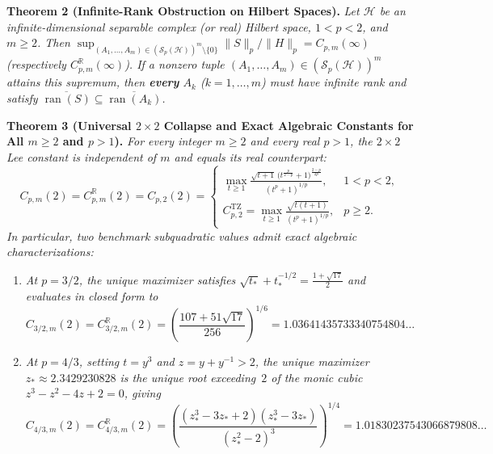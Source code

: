 \documentclass[10pt,letterpaper]{article}
\newcommand{\R}{\mathbb{R}}
\newcommand{\Hilb}{\mathcal{H}}
\newcommand{\Sp}{\mathcal{S}_p}
\newcommand{\ran}{\operatorname{ran}}
\newcommand{\TZ}{\mathrm{TZ}}
\begin{document}
\begin{tcolorbox}[mathbox]
\textbf{Theorem 2 (Infinite-Rank Obstruction on Hilbert Spaces).}
\emph{Let $\Hilb$ be an infinite-dimensional separable complex (or real) Hilbert space, $1 < p < 2$, and $m \ge 2$. Then $\sup_{(A_1,\dots,A_m)\in(\Sp(\Hilb))^m\setminus\{0\}} \|S\|_p / \|H\|_p = C_{p,m}(\infty)$ (respectively $C_{p,m}^{\R}(\infty)$). If a nonzero tuple $(A_1,\dots,A_m) \in (\Sp(\Hilb))^m$ attains this supremum, then \textbf{every} $A_k$ ($k = 1,\dots,m$) must have infinite rank and satisfy $\overline{\ran(S)} \subseteq \overline{\ran(A_k)}$.}
\end{tcolorbox}

\begin{tcolorbox}[mathbox]
\textbf{Theorem 3 (Universal $2\times 2$ Collapse and Exact Algebraic Constants for All $m \ge 2$ and $p > 1$).}
\emph{For every integer $m \ge 2$ and every real $p > 1$, the $2\times 2$ Lee constant is independent of $m$ and equals its real counterpart:}
\[
  C_{p,m}(2) = C_{p,m}^{\R}(2) = C_{p,2}(2) =
  \begin{cases}
    \displaystyle \max_{t \ge 1}\frac{\sqrt{t+1}\,\bigl(t^{\frac{p}{2-p}} + 1\bigr)^{\frac{2-p}{2p}}}{(t^p + 1)^{1/p}}, & 1 < p < 2,\\[12pt]
    \displaystyle C_{p,2}^{\TZ} = \max_{t \ge 1}\frac{\sqrt{t(t+1)}}{(t^p + 1)^{1/p}}, & p \ge 2.
  \end{cases}
\]
\emph{In particular, two benchmark subquadratic values admit exact algebraic characterizations:}
\begin{enumerate}[leftmargin=1.6em,itemsep=2pt,topsep=3pt]
  \item \emph{At $p = 3/2$, the unique maximizer satisfies $\sqrt{t_*} + t_*^{-1/2} = \frac{1+\sqrt{17}}{2}$ and evaluates in closed form to}
  \[
    C_{3/2,m}(2) = C_{3/2,m}^{\R}(2) = \left(\frac{107 + 51\sqrt{17}}{256}\right)^{1/6} = 1.03641435733340754804\dots
  \]
  \item \emph{At $p = 4/3$, setting $t = y^3$ and $z = y + y^{-1} > 2$, the unique maximizer $z_* \approx 2.3429230828$ is the unique root exceeding~$2$ of the monic cubic $z^3 - z^2 - 4z + 2 = 0$, giving}
  \[
    C_{4/3,m}(2) = C_{4/3,m}^{\R}(2) = \left(\frac{(z_*^3 - 3z_* + 2)(z_*^3 - 3z_*)}{(z_*^2 - 2)^3}\right)^{1/4} = 1.01830237543066879808\dots
  \]
\end{enumerate}
\end{tcolorbox}
\end{document}
